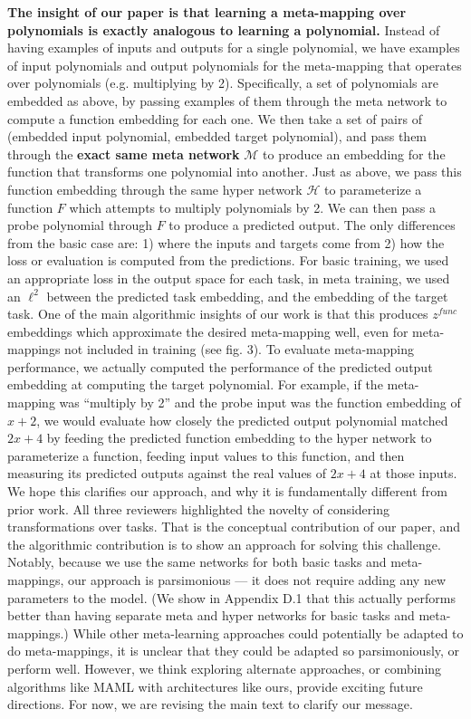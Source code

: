 \documentclass{article}
\begin{document}
\textbf{The insight of our paper is that learning a meta-mapping over polynomials is exactly analogous to learning a polynomial.} Instead of having examples of inputs and outputs for a single polynomial, we have examples of input polynomials and output polynomials for the meta-mapping that operates over polynomials (e.g. multiplying by 2). Specifically, a set of polynomials are embedded as above, by passing examples of them through the meta network to compute a function embedding for each one. We then take a set of pairs of (embedded input polynomial, embedded target polynomial), and pass them through the \textbf{exact same meta network} $\mathcal{M}$ to produce an embedding for the function that transforms one polynomial into another. Just as above, we pass this function embedding through the same hyper network $\mathcal{H}$ to parameterize a function $F$ which attempts to multiply polynomials by 2. We can then pass a probe polynomial through $F$ to produce a predicted output. The only differences from the basic case are: 1) where the inputs and targets come from 2) how the loss or evaluation is computed from the predictions. For basic training, we used an appropriate loss in the output space for each task, in meta training, we used an $\ell^2$ between the predicted task embedding, and the embedding of the target task. One of the main algorithmic insights of our work is that this produces $z^{func}$ embeddings which approximate the desired meta-mapping well, even for meta-mappings not included in training (see fig. 3). To evaluate meta-mapping performance, we actually computed the performance of the predicted output embedding at computing the target polynomial. For example, if the meta-mapping was ``multiply by 2'' and the probe input was the function embedding of $x + 2$, we would evaluate how closely the predicted output polynomial matched $2x + 4$ by feeding the predicted function embedding to the hyper network to parameterize a function, feeding input values to this function, and then measuring its predicted outputs against the real values of $2x+4$ at those inputs. We hope this clarifies our approach, and why it is fundamentally different from prior work. All three reviewers highlighted the novelty of considering transformations over tasks. That is the conceptual contribution of our paper, and the algorithmic contribution is to show an approach for solving this challenge. Notably, because we use the same networks for both basic tasks and meta-mappings, our approach is parsimonious --- it does not require adding any new parameters to the model. (We show in Appendix D.1 that this actually performs better than having separate meta and hyper networks for basic tasks and meta-mappings.) While other meta-learning approaches could potentially be adapted to do meta-mappings, it is unclear that they could be adapted so parsimoniously, or perform well. However, we think exploring alternate approaches, or combining algorithms like MAML with architectures like ours, provide exciting future directions. For now, we are revising the main text to clarify our message. \par 
\end{document}
